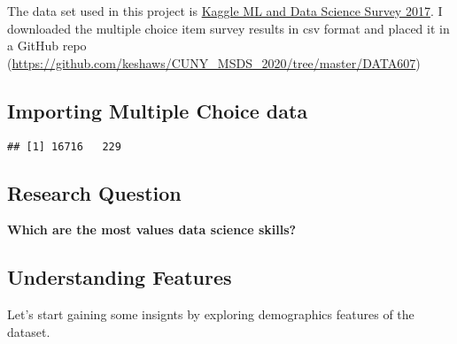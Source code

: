 \documentclass[]{article}
\newenvironment{Shaded}{\begin{snugshade}}{\end{snugshade}}
\newcommand{\CommentTok}[1]{\textcolor[rgb]{0.56,0.35,0.01}{\textit{#1}}}
\newcommand{\KeywordTok}[1]{\textcolor[rgb]{0.13,0.29,0.53}{\textbf{#1}}}
\newcommand{\NormalTok}[1]{#1}
\newcommand{\OperatorTok}[1]{\textcolor[rgb]{0.81,0.36,0.00}{\textbf{#1}}}
\newcommand{\StringTok}[1]{\textcolor[rgb]{0.31,0.60,0.02}{#1}}
\begin{document}
The data set used in this project is
\href{https://www.kaggle.com/kaggle/kaggle-survey-2017/feed}{Kaggle ML
and Data Science Survey 2017}. I downloaded the multiple choice item
survey results in csv format and placed it in a GitHub repo
(\url{https://github.com/keshaws/CUNY_MSDS_2020/tree/master/DATA607})

\hypertarget{importing-multiple-choice-data}{%
\subsection{Importing Multiple Choice
data}\label{importing-multiple-choice-data}}

\begin{Shaded}
\end{Shaded}

\begin{verbatim}
## [1] 16716   229
\end{verbatim}

\hypertarget{research-question}{%
\subsection{Research Question}\label{research-question}}

\textbf{Which are the most values data science skills?}

\hypertarget{understanding-features}{%
\subsection{Understanding Features}\label{understanding-features}}

Let's start gaining some insignts by exploring demographics features of
the dataset.
\end{document}
